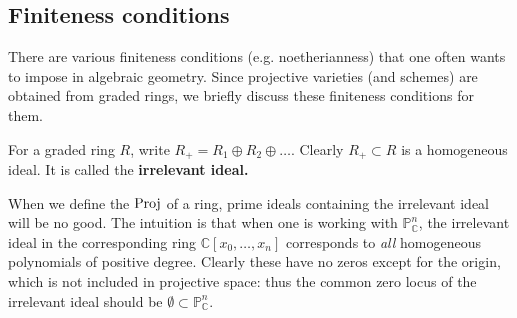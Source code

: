 \subsection{Finiteness conditions}
There are various finiteness conditions (e.g. noetherianness) that one often wants to impose in
algebraic geometry.
Since projective varieties (and schemes) are obtained from graded rings,
we briefly discuss these finiteness conditions for them.

\begin{definition}
For a graded ring $R$, write $R_+ = R_1 \oplus R_2 \oplus \dots$. Clearly $R_+
\subset R$ is a homogeneous ideal. It is called the \textbf{irrelevant ideal.}
\end{definition}

When we define the $\operatorname{Proj}$ of a ring, prime ideals containing the irrelevant ideal
will be no good. The intuition is that when one is working with
$\mathbb{P}^n_{\mathbb{C}}$, the irrelevant ideal in the corresponding ring
$\mathbb{C}[x_0, \dots, x_n]$ corresponds to \emph{all} homogeneous polynomials
of positive degree. Clearly these have no zeros except for the origin, which is
not included in projective space: thus the common zero locus of the irrelevant
ideal should be $\emptyset \subset \mathbb{P}^n_{\mathbb{C}}$.

